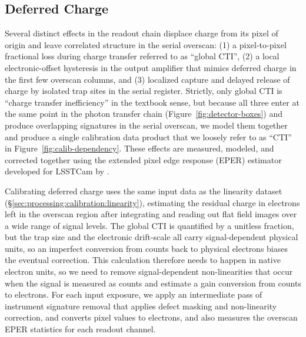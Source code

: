 

\subsection{Deferred Charge} \label{sec:processing:calibration:cti}

Several distinct effects in the readout chain displace charge from its pixel of origin and leave correlated structure in the serial overscan: (1) a pixel-to-pixel fractional loss during charge transfer referred to as ``global CTI'', (2) a local electronic-offset hysteresis in the output amplifier that mimics deferred charge in the first few overscan columns, and (3) localized capture and delayed release of charge by isolated trap sites in the serial register.
Strictly, only global CTI is ``charge transfer inefficiency'' in the textbook sense, but because all three enter at the same point in the photon transfer chain (Figure~\ref{fig:detector-boxes}) and produce overlapping signatures in the serial overscan, we model them together and produce a single calibration data product that we loosely refer to as ``CTI'' in Figure~\ref{fig:calib-dependency}.
These effects are measured, modeled, and corrected together using the extended pixel edge response (EPER) estimator developed for LSSTCam by \citet{2021JATIS...7d48002S}.

Calibrating deferred charge uses the same input data as the linearity dataset (\S\ref{sec:processing:calibration:linearity}), estimating the residual charge in electrons left in the overscan region after integrating and reading out flat field images over a wide range of signal levels.
The global CTI is quantified by a unitless fraction, but the trap size and the electronic drift-scale all carry signal-dependent physical units, so an imperfect conversion from counts back to physical electrons biases the eventual correction.
This calculation therefore needs to happen in native electron units, so we need to remove signal-dependent non-linearities that occur when the signal is measured as counts and estimate a gain conversion from counts to electrons.
For each input exposure, we apply an intermediate pass of instrument signature removal that applies defect masking and non-linearity correction, and converts pixel values to electrons, and also measures the overscan EPER statistics for each readout channel.


